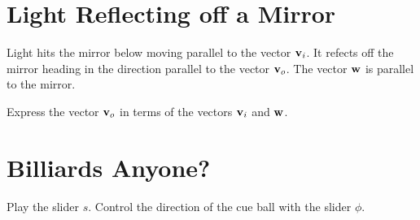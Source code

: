 \documentclass{ximera}
\begin{document}
\section{Light Reflecting off a Mirror}
\begin{exploration}  \label{E32fvsav:Scalar}
Light hits the mirror below moving parallel to the vector ${\bf v}_{i}$. It refects off the mirror heading in the direction parallel to the vector ${\bf v}_o$. The vector ${\bf w}$ is parallel to the mirror.

Express the vector ${\bf v}_o$ in terms of the vectors ${\bf v}_{i}$ and ${\bf w}$.

 
\begin{onlineOnly}
    \begin{center}
\end{center}
\end{onlineOnly}


\end{exploration}



\begin{exploration}  \label{E32fvsdf9v:Scalar}

 
\begin{onlineOnly}
    \begin{center}
\end{center}
\end{onlineOnly}


\end{exploration}



\section{Billiards Anyone?}

\begin{exploration}\label{exp:pc1c}
Play the slider $s$. Control the direction of the cue ball with the slider $\phi$. 

 
\begin{onlineOnly}
    \begin{center}
\end{center}
\end{onlineOnly}
\end{exploration}
\end{document}
